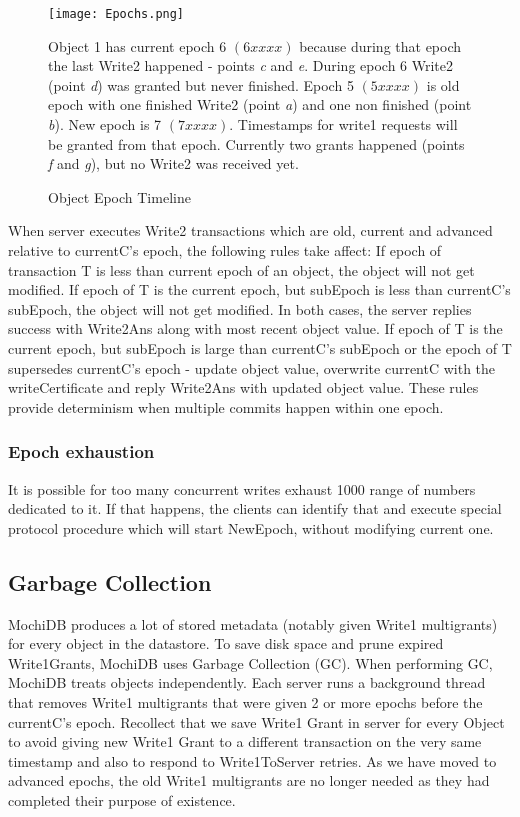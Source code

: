 \documentclass[letterpaper,twocolumn,10pt]{article}
\begin{document}
\begin{figure*}
\texttt{[image: Epochs.png]}
\label{fig:epochs_view}
\caption{Object Epoch Timeline}
\small Object 1 has current epoch 6 $\left(6xxxx\right)$ because during that epoch the last Write2 happened - points \textit{c} and \textit{e}. During epoch 6 Write2 (point \textit{d}) was granted but never finished. Epoch 5 $\left(5xxxx\right)$ is old epoch with one finished Write2 (point \textit{a}) and one non finished (point \textit{b}). New epoch is 7 $\left(7xxxx\right)$. Timestamps for write1 requests will be granted from that epoch. Currently two grants happened (points \textit{f} and \textit{g}), but no Write2 was received yet.
\centering
\end{figure*}

When server executes Write2 transactions which are old, current and advanced relative to currentC's epoch, the following rules take affect: If epoch of transaction T is less than current epoch of an object, the object will not get modified. If epoch of T is the current epoch, but subEpoch is less than currentC's subEpoch, the object will not get modified. In both cases, the server replies success with Write2Ans along with most recent object value. If epoch of T is the current epoch, but subEpoch is large than currentC's subEpoch or the epoch of T supersedes currentC's epoch - update object value, overwrite currentC with the writeCertificate and reply Write2Ans with updated object value. These rules provide determinism when multiple commits happen within one epoch.

\subsubsection{Epoch exhaustion}
It is possible for too many concurrent writes exhaust 1000 range of numbers dedicated to it. If that happens, the clients can identify that and execute special protocol procedure which will start NewEpoch, without modifying current one.

\subsection{Garbage Collection}
MochiDB produces a lot of stored metadata (notably given Write1 multigrants) for every object in the datastore. To save disk space and prune expired Write1Grants, MochiDB uses Garbage Collection (GC). When performing GC, MochiDB treats objects independently. Each server runs a background thread that removes Write1 multigrants that were given 2 or more epochs before the currentC's epoch. Recollect that we save Write1 Grant in server for every Object to avoid giving new Write1 Grant to a different transaction on the very same timestamp and also to respond to Write1ToServer retries. As we have moved to advanced epochs, the old Write1 multigrants are no longer needed as they had completed their purpose of existence.  
\end{document}
